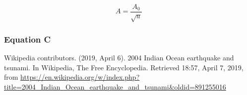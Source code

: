 \documentclass[a4paper,12pt,twoside]{article}
\begin{document}
      \begin{equation}
        \boxed{A=\frac{A_0}{\sqrt{u}}} %
        \label{eq:WKB-B}
      \end{equation}

    \subsubsection{Equation C}
        \lipsum[1-2] %





  \newpage
  \begin{thebibliography}{99}
     Wikipedia contributors. (2019, April 6). 2004 Indian Ocean earthquake and tsunami. In Wikipedia, The Free Encyclopedia. Retrieved 18:57, April 7, 2019, from \url{https://en.wikipedia.org/w/index.php?title=2004_Indian_Ocean_earthquake_and_tsunami&oldid=891255016}


  \end{thebibliography}
\end{document}
